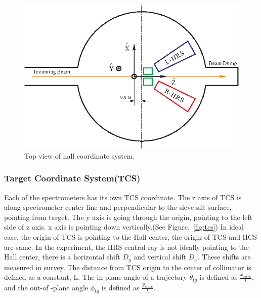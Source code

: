 \begin{figure}
  \begin{center}
	\includegraphics[scale=0.8]{figs/hcs}
  \end{center}
  \caption[Top view of hall coordinate sytem]
  {Top view of hall coordinate system.}
  \label{fig:hcs}
\end{figure}

\subsubsection{Target Coordinate System(TCS)}

Each of the spectrometers has its own TCS coordinate. The z axis of TCS is
along spectrometer center line and perpendicular to the sieve slit surface,
pointing from target. The y axis is going through the origin, pointing to 
the left side of z axis. x axis is pointing down vertically.(See
Figure.~\ref{fig:tcs}) In ideal case,
the origin of TCS is pointing to the Hall center, the origin of TCS and HCS
are same. In the experiment, the HRS central ray is not ideally pointing to
the Hall center, there is a horizontal shift $D_y$ and vertical shift $D_x$.
These shifts are measured in survey. The distance from TCS origin to the
center of collimator is defined as a constant, L. The in-plane angle of a
trajectory $\theta_{tg}$ is defined as $\frac{x_{sieve}}{L}$, and the out-of
-plane angle $\phi_{tg}$ is defined as $\frac{y_{sieve}}{L}$.

